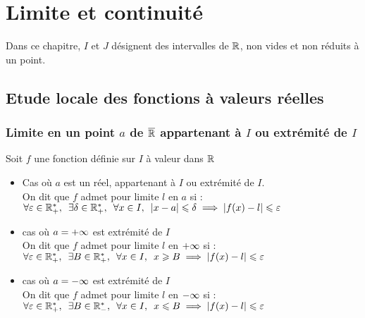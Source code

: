 \chapter{Limite et continuité}

\minitoc
\begin{nota}
    Dans ce chapitre, \(I\) et \(J\) désignent des intervalles de \(\mathbb{R}\), non vides et non réduits à un point.
\end{nota}
\section{Etude locale des fonctions à valeurs réelles}
\subsection{Limite en un point \(a\) de \(\overline{\mathbb{R}}\) appartenant à \(I\) ou extrémité de \(I\)}

\begin{defi}
    Soit \(f\) une fonction définie sur \(I\) à  valeur dans \(\mathbb{R}\)
    \begin{itemize}
        \item Cas où \(a\) est un réel, appartenant à \(I\) ou extrémité de \(I\).\\
        On dit que \(f\) admet pour limite \(l\) en \(a\) si : \(\quantifs{\forall \epsilon \in \Rps;\exists\delta \in \Rps;\forall x \in I} \abs{x-a}\leq \delta \imp \abs{f(x)-l}\leq \epsilon\)
        \item cas où \(a = +\infty\) est extrémité de \(I\)\\
            On dit que \(f\) admet pour limite \(l\) en \(+\infty\) si : \(\quantifs{\forall \epsilon \in \Rps;\exists B \in \Rps;\forall x \in I} x\geq B \imp \abs{f(x)-l}\leq \epsilon\)
        \item cas où \(a = -\infty\) est extrémité de \(I\)\\
         On dit que \(f\) admet pour limite \(l\) en \(-\infty\) si : \(\quantifs{\forall \epsilon \in \Rps;\exists B \in \Rms;\forall x \in I} x\leq B \imp \abs{f(x)-l}\leq \epsilon\)
    \end{itemize}
\end{defi}


